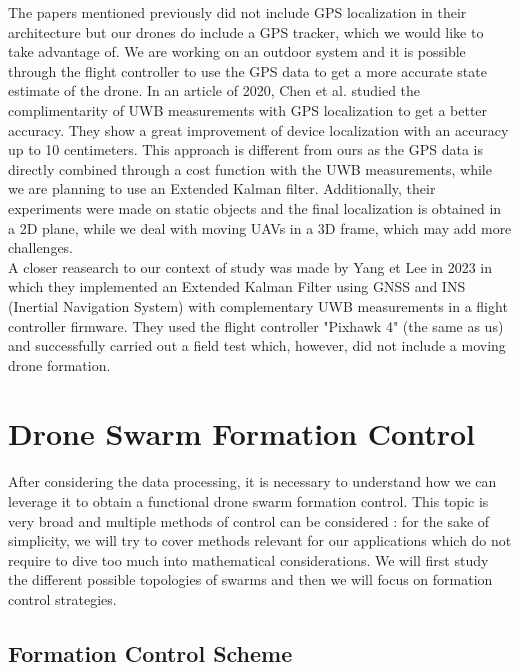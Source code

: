 The papers mentioned previously did not include GPS localization in their architecture but our drones do include a GPS tracker, which we would like to take advantage of. We are working on an outdoor system and it is possible through the flight controller to use the GPS data to get a more accurate state estimate of the drone. In an article of 2020, Chen et al. \parencite{chen_2020} studied the complimentarity of UWB measurements with GPS localization to get a better accuracy. They show a great improvement of device localization with an accuracy up to 10 centimeters. This approach is different from ours as the GPS data is directly combined through a cost function with the UWB measurements, while we are planning to use an Extended Kalman filter. Additionally, their experiments were made on static objects and the final localization is obtained in a 2D plane, while we deal with moving UAVs in a 3D frame, which may add more challenges. 
\\

A closer reasearch to our context of study was made by Yang et Lee in 2023 \parencite{yang_2023} in which they implemented an Extended Kalman Filter using GNSS and INS (Inertial Navigation System) with complementary UWB measurements in a flight controller firmware. They used the flight controller "Pixhawk 4" (the same as us)  and successfully carried out a field test which, however, did not include a moving drone formation. 

\section{Drone Swarm Formation Control}

After considering the data processing, it is necessary to understand how we can leverage it to obtain a functional drone swarm formation control.
This topic is very broad and multiple methods of control can be considered : for the sake of simplicity, we will try to cover methods relevant for our applications which do not require to dive too much into mathematical considerations.
We will first study the different possible topologies of swarms and then we will focus on formation control strategies. 


\subsection{Formation Control Scheme}

